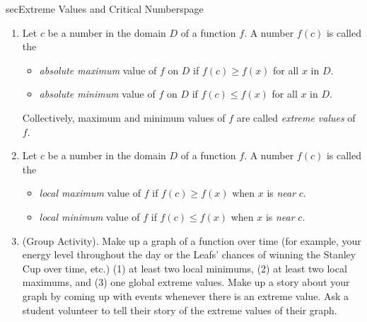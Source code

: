\documentclass[../main]{subfiles}
\begin{document}
\clearpage

%
%
\begin{outline}{sec}{Extreme Values and Critical Numbers}{page}\label{outline:evt}
  \begin{enumerate}
    \item Let \(c\) be a number in the domain \(D\) of a function \(f\). A number \(f(c)\) is called the
      \begin{itemize}
        \item \emph{absolute maximum} value of \(f\) on \(D\) if \(f(c) \ge f(x)\) for all \(x\) in \(D\).
        \item \emph{absolute minimum} value of \(f\) on \(D\) if \(f(c) \le f(x)\) for all \(x\) in \(D\).
      \end{itemize}

      Collectively, maximum and minimum values of \(f\) are called \emph{extreme values} of \(f\). 

    \item Let \(c\) be a number in the domain \(D\) of a function \(f\). A number \(f(c)\) is called the
      \begin{itemize}
        \item \emph{local maximum} value of \(f\) if \(f(c) \ge f(x)\) when \(x\) is \emph{near} \(c\).
        \item \emph{local minimum} value of \(f\) if \(f(c) \le f(x)\) when \(x\) is \emph{near} \(c\).
      \end{itemize}

    \item (Group Activity). Make up a graph of a function over time (for example, your energy level throughout the day or the Leafs' chances of winning the Stanley Cup over time, etc.) (1) at least two local minimums, (2) at least two local maximums, and (3) one global extreme values. Make up a story about your graph by coming up with events whenever there is an extreme value. Ask a student volunteer to tell their story of the extreme values of their graph.


\end{enumerate}
\end{outline}
\end{document}
